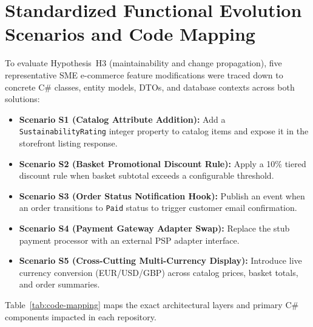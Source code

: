 \section{Standardized Functional Evolution Scenarios and Code Mapping}
\label{sec:change-scenarios}

To evaluate Hypothesis~H3 (maintainability and change propagation), five representative SME e-commerce feature modifications were traced down to concrete C\# classes, entity models, DTOs, and database contexts across both solutions:
\begin{itemize}[leftmargin=1.5em]
  \item \textbf{Scenario S1 (Catalog Attribute Addition):} Add a \texttt{SustainabilityRating} integer property to catalog items and expose it in the storefront listing response.
  \item \textbf{Scenario S2 (Basket Promotional Discount Rule):} Apply a 10\% tiered discount rule when basket subtotal exceeds a configurable threshold.
  \item \textbf{Scenario S3 (Order Status Notification Hook):} Publish an event when an order transitions to \texttt{Paid} status to trigger customer email confirmation.
  \item \textbf{Scenario S4 (Payment Gateway Adapter Swap):} Replace the stub payment processor with an external PSP adapter interface.
  \item \textbf{Scenario S5 (Cross-Cutting Multi-Currency Display):} Introduce live currency conversion (EUR/USD/GBP) across catalog prices, basket totals, and order summaries.
\end{itemize}

Table~\ref{tab:code-mapping} maps the exact architectural layers and primary C\# components impacted in each repository.

